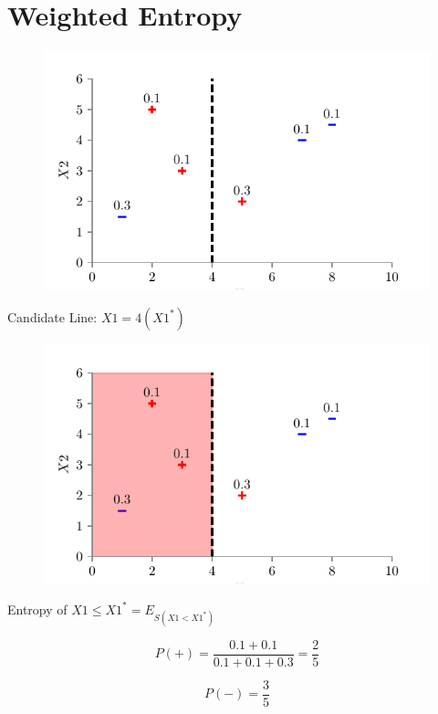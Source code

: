 \documentclass[usenames,dvipsnames]{beamer}
\begin{document}
	\section{Weighted Entropy}

	\begin{frame}
	
	\begin{figure}
		\centering
		\includegraphics{../assets/decision-trees/figures/dt_weighted/fig3.pdf}
	\end{figure}

	Candidate Line: \(X1 = 4 (X1^*)\)

	\end{frame}

	\begin{frame}
	\begin{figure}
		\centering
		\includegraphics{../assets/decision-trees/figures/dt_weighted/fig4.pdf}
	\end{figure}
	
	Entropy of \(X1 \leq X1^*  = E_{S(X1 < X1^*)}\)
	
	$$P(+) = \frac{0.1 + 0.1}{0.1 + 0.1 + 0.3} = \frac{2}{5}$$
	
	$$P(-) = \frac{3}{5}$$

	\end{frame}
\end{document}
